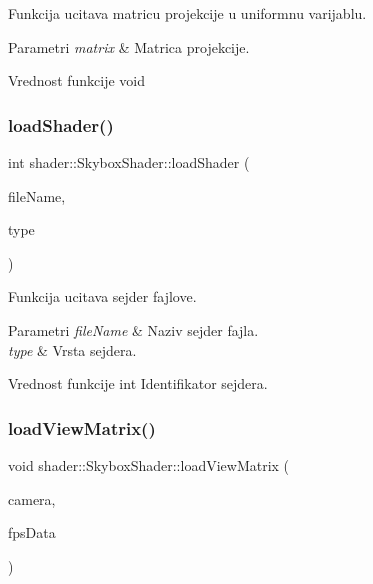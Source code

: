 Funkcija ucitava matricu projekcije u uniformnu varijablu. 


\begin{DoxyParams}{Parametri}
{\em matrix} & Matrica projekcije. \\
\hline
\end{DoxyParams}
\begin{DoxyReturn}{Vrednost funkcije}
void 
\end{DoxyReturn}
\mbox{\label{classshader_1_1SkyboxShader_a3d221aee6e11f91ea59332956e5edcbb}} 
\subsubsection{\texorpdfstring{load\+Shader()}{loadShader()}}
{\footnotesize\ttfamily int shader\+::\+Skybox\+Shader\+::load\+Shader (\begin{DoxyParamCaption}\item[{const char $\ast$}]{file\+Name,  }\item[{G\+Lenum}]{type }\end{DoxyParamCaption})\hspace{0.3cm}{\ttfamily [private]}}



Funkcija ucitava sejder fajlove. 


\begin{DoxyParams}{Parametri}
{\em file\+Name} & Naziv sejder fajla. \\
\hline
{\em type} & Vrsta sejdera. \\
\hline
\end{DoxyParams}
\begin{DoxyReturn}{Vrednost funkcije}
int Identifikator sejdera. 
\end{DoxyReturn}
\mbox{\label{classshader_1_1SkyboxShader_ad9d6069bb62fc7b3bfb6e8ee0bfe8784}} 
\subsubsection{\texorpdfstring{load\+View\+Matrix()}{loadViewMatrix()}}
{\footnotesize\ttfamily void shader\+::\+Skybox\+Shader\+::load\+View\+Matrix (\begin{DoxyParamCaption}\item[{\hyperlink{classentity_1_1Camera}{Camera} $\ast$}]{camera,  }\item[{\hyperlink{classutility_1_1FpsData}{Fps\+Data} $\ast$}]{fps\+Data }\end{DoxyParamCaption})}



